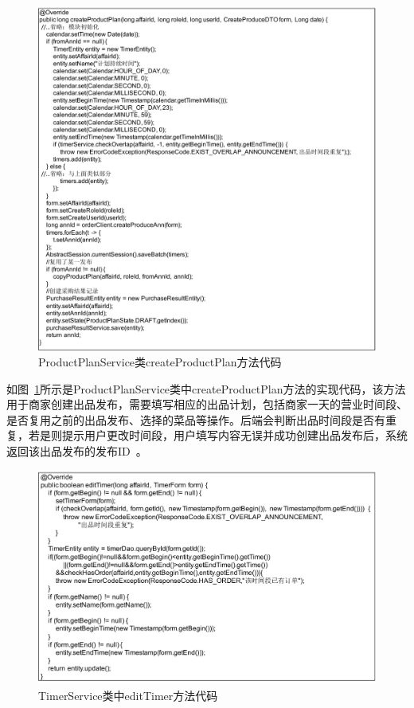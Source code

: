 \begin{figure}[htbp!]
    \centering
    \includegraphics[width=4.5in]{FIGs/chapter4/14.pdf}
    \caption{ProductPlanService类createProductPlan方法代码}\label{fig_dish_14}
\end{figure}

如图~\ref{fig_dish_14}所示是ProductPlanService类中createProductPlan方法的实现代码，该方法用于商家创建出品发布，需要填写相应的出品计划，包括商家一天的营业时间段、是否复用之前的出品发布、选择的菜品等操作。后端会判断出品时间段是否有重复，若是则提示用户更改时间段，用户填写内容无误并成功创建出品发布后，系统返回该出品发布的发布ID~\cite{tkx2014}。

\begin{figure}[htbp!]
    \centering
    \includegraphics[width=4.5in]{FIGs/chapter4/15.pdf}
    \caption{TimerService类中editTimer方法代码}\label{fig_dish_15}
\end{figure}

